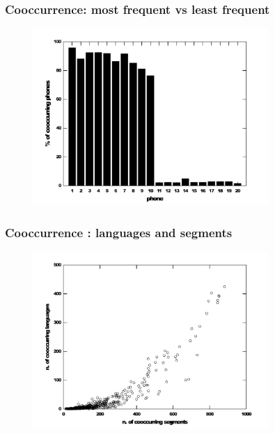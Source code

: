 \documentclass{beamer}
\begin{document}
\frame
{
  \frametitle{Cooccurrence: most frequent vs least frequent}
  \vspace{-0.5cm}
  \begin{figure}[h!]
  \centering
  \includegraphics[width=0.8\textwidth]{images/numper_cooccurring_phones_10.pdf}
  \label{fig:numper_cooccurring_phones_10}
  \end{figure} 
}

\frame
{
  \frametitle{Cooccurrence : languages and segments}
  \vspace{-0.3cm}
  \begin{figure}[h!]
  \centering
  \includegraphics[width=0.8\textwidth]{images/coocc_of_speech_sounds.pdf}
  \label{fig:coocc_of_speech_sounds}
  \end{figure} 
}
\end{document}
